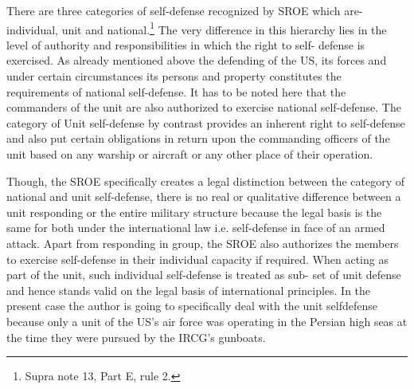 \begin{multicols}{2}

\noi
There are three categories of self-defense recognized by SROE which are- individual, unit
and national.\footnote{ Supra note 13, Part E, rule 2.} The very difference in this hierarchy lies in the level of authority and
responsibilities in which the right to self- defense is exercised. As already mentioned above
the defending of the US, its forces and under certain circumstances its persons and property
constitutes the requirements of national self-defense. It has to be noted here that the
commanders of the unit are also authorized to exercise national self-defense. The category
of Unit self-defense by contrast provides an inherent right to self-defense and also put
certain obligations in return upon the commanding officers of the unit based on any warship
or aircraft or any other place of their operation.

\noi
Though, the SROE specifically creates a legal distinction between the category of national
and unit self-defense, there is no real or qualitative difference between a unit responding or
the entire military structure because the legal basis is the same for both under the
international law i.e. self-defense in face of an armed attack. Apart from responding in
group, the SROE also authorizes the members to exercise self-defense in their individual
capacity if required. When acting as part of the unit, such individual self-defense is treated
as sub- set of unit defense and hence stands valid on the legal basis of international
principles. In the present case the author is going to specifically deal with the unit selfdefense because only a unit of the US’s air force was operating in the Persian high seas at
the time they were pursued by the IRCG’s gunboats.



\end{multicols}
